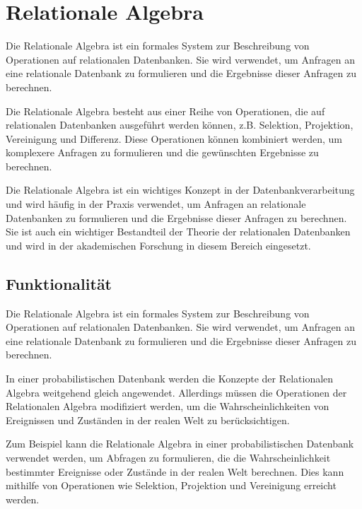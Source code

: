 \chapter{Relationale Algebra}
Die Relationale Algebra ist ein formales System zur Beschreibung von Operationen auf relationalen Datenbanken. Sie wird verwendet, um Anfragen an eine relationale Datenbank zu formulieren und die Ergebnisse dieser Anfragen zu berechnen.


Die Relationale Algebra besteht aus einer Reihe von Operationen, die auf relationalen Datenbanken ausgeführt werden können, z.B. Selektion, Projektion, Vereinigung und Differenz. Diese Operationen können kombiniert werden, um komplexere Anfragen zu formulieren und die gewünschten Ergebnisse zu berechnen.

Die Relationale Algebra ist ein wichtiges Konzept in der Datenbankverarbeitung und wird häufig in der Praxis verwendet, um Anfragen an relationale Datenbanken zu formulieren und die Ergebnisse dieser Anfragen zu berechnen. Sie ist auch ein wichtiger Bestandteil der Theorie der relationalen Datenbanken und wird in der akademischen Forschung in diesem Bereich eingesetzt.






\section{Funktionalität}

Die Relationale Algebra ist ein formales System zur Beschreibung von Operationen auf relationalen Datenbanken. Sie wird verwendet, um Anfragen an eine relationale Datenbank zu formulieren und die Ergebnisse dieser Anfragen zu berechnen.
\vspace{1cm}

In einer probabilistischen Datenbank werden die Konzepte der Relationalen Algebra weitgehend gleich angewendet. Allerdings müssen die Operationen der Relationalen Algebra modifiziert werden, um die Wahrscheinlichkeiten von Ereignissen und Zuständen in der realen Welt zu berücksichtigen.
\vspace{1cm}

Zum Beispiel kann die Relationale Algebra in einer probabilistischen Datenbank verwendet werden, um Abfragen zu formulieren, die die Wahrscheinlichkeit bestimmter Ereignisse oder Zustände in der realen Welt berechnen. Dies kann mithilfe von Operationen wie Selektion, Projektion und Vereinigung erreicht werden.
\vspace{1cm}

